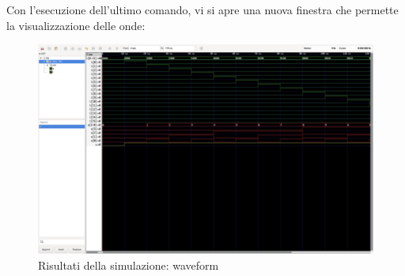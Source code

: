 Con l'esecuzione dell'ultimo comando, vi si apre una nuova finestra che permette la visualizzazione delle onde:
 \begin{figure}[H]
	\centering
	\includegraphics[width=1\textwidth]{img/waves_sim_16_1}
	\caption{Risultati della simulazione: waveform}
	\label{comandi_sim_mux_16:1} 
\end{figure}


